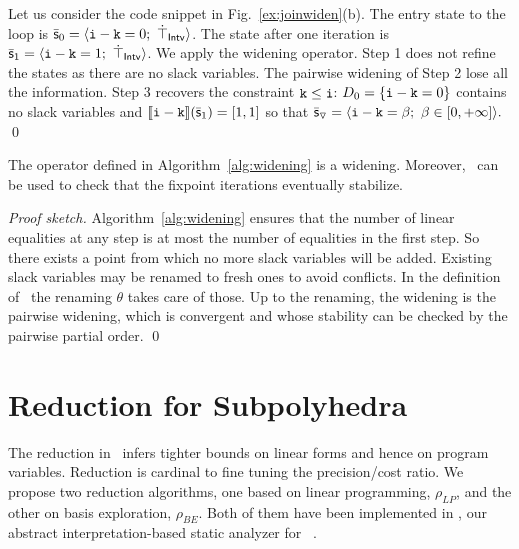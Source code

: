 \documentclass[sttt]{svjour}
\begin{document}
\begin{example}
Let us consider the code snippet in Fig.~\ref{ex:joinwiden}(b).
The entry state to the loop is
\(
\bar{\mathsf{\mathsf{s}}}_0  = \langle  \mathtt{i} - \mathtt{k} = 0;\ \dot \top_{\mathsf{Intv}} \rangle \).
The state after one iteration is
\(\bar{\mathsf{\mathsf{s}}}_1  = \langle  \mathtt{i} -\mathtt{k} = 1;\  \dot \top_{\mathsf{Intv}} \rangle \).
We apply the widening operator. 
Step 1 does not refine the states as there are no slack variables.
The pairwise widening of Step 2 lose all the information.
Step 3 recovers the constraint $\mathtt{k} \leq \mathtt{i}$:
 $D_0 = \{ \mathtt{i} -\mathtt{k} = 0 \}$  contains no slack variables and 
$\llbracket \mathtt{\mathtt{i} -\mathtt{k} } \rrbracket(\bar{\mathsf{\mathsf{s}}}_1) = [1, 1]$ so that 
\(
\bar{\mathsf{\mathsf{s}}}_{\triangledown} = \langle  \mathtt{i} -\mathtt{k} = \beta_{};\ \beta_{} \in [0, +\infty]  \rangle.
\)
\qed
\end{example}

\begin{theorem}
The operator defined in Algorithm~\ref{alg:widening} is a widening. Moreover, \lessS\ can be used to check  that the fixpoint iterations eventually stabilize.
\end{theorem}
\textit{Proof sketch.}
Algorithm~\ref{alg:widening} ensures that the number of linear equalities at any step is at most the number of equalities in the first step. 
So there exists a point from which no more slack variables will be added. 
Existing slack variables may be renamed to fresh ones to avoid conflicts.
In the definition of  \lessS\ the renaming $\theta$ takes care of those.
Up to the renaming, the widening is  the pairwise widening, which is convergent and whose stability can be checked by the pairwise partial order.
\qed

\section{Reduction for Subpolyhedra}
The reduction in \SubPolyhedra\  infers tighter bounds on linear forms and hence on program variables.
Reduction is cardinal to fine tuning the precision/cost ratio.
We propose two reduction algorithms, one based on linear programming, $\rho_{LP}$, and the other on basis exploration, $\rho_{BE}$.
Both of them have been implemented in \Clousot, our abstract interpretation-based static analyzer for \NET~\cite{MafLogozzo10}.
\end{document}
